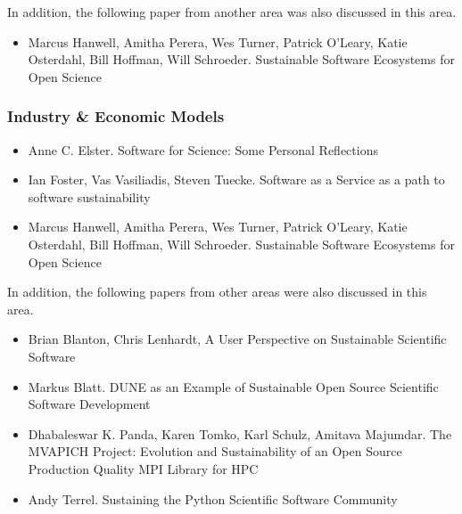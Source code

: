 \documentclass[11pt, oneside]{amsart}
\begin{document}
In addition, the following paper from another area was also discussed in this area.

\begin{itemize}

\item Marcus Hanwell, Amitha Perera, Wes Turner, Patrick O'Leary, Katie Osterdahl, Bill Hoffman, Will Schroeder. Sustainable Software Ecosystems for Open Science \cite{Hanwell_WSSSPE}

\end{itemize}

\subsubsection*{Industry \& Economic Models}

\begin{itemize}

\item Anne C. Elster. Software for Science: Some Personal Reflections \cite{Elster_WSSSPE}

\item Ian Foster, Vas Vasiliadis, Steven Tuecke. Software as a Service as a path to software sustainability \cite{Foster_WSSSPE}

\item Marcus Hanwell, Amitha Perera, Wes Turner, Patrick O'Leary, Katie Osterdahl, Bill Hoffman, Will Schroeder. Sustainable Software Ecosystems for Open Science \cite{Hanwell_WSSSPE}

\end{itemize}

In addition, the following papers from other areas were also discussed in this area.

\begin{itemize}

\item Brian Blanton, Chris Lenhardt, A User Perspective on Sustainable Scientific Software \cite{Blanton_WSSSPE}

\item Markus Blatt. DUNE as an Example of Sustainable Open Source Scientific Software Development \cite{Blatt_WSSSPE}

\item Dhabaleswar K. Panda, Karen Tomko, Karl Schulz, Amitava Majumdar. The MVAPICH Project: Evolution and Sustainability of an Open Source Production Quality MPI Library for HPC \cite{Panda_WSSSPE}

\item Andy Terrel. Sustaining the Python Scientific Software Community \cite{Terrel_WSSSPE}

\end{itemize}
\end{document}
